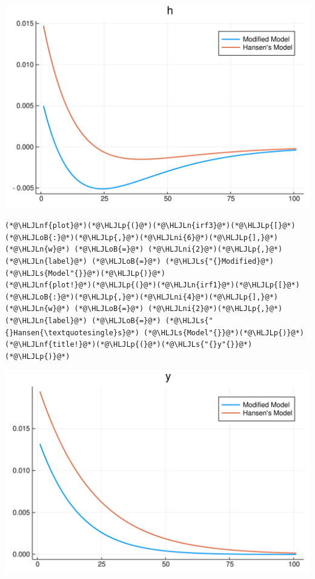 \documentclass[12pt,a4paper]{article}
\newcommand{\HLJLn}[1]{#1}
\newcommand{\HLJLnf}[1]{\textcolor[RGB]{66,102,213}{#1}}
\newcommand{\HLJLs}[1]{\textcolor[RGB]{201,61,57}{#1}}
\newcommand{\HLJLni}[1]{\textcolor[RGB]{59,151,46}{#1}}
\newcommand{\HLJLoB}[1]{\textcolor[RGB]{102,102,102}{\textbf{#1}}}
\newcommand{\HLJLp}[1]{#1}
\begin{document}
\includegraphics[width=\linewidth]{figures/yvan_16_1.pdf}

\begin{lstlisting}
(*@\HLJLnf{plot}@*)(*@\HLJLp{(}@*)(*@\HLJLn{irf3}@*)(*@\HLJLp{[}@*)(*@\HLJLoB{:}@*)(*@\HLJLp{,}@*)(*@\HLJLni{6}@*)(*@\HLJLp{],}@*) (*@\HLJLn{w}@*) (*@\HLJLoB{=}@*) (*@\HLJLni{2}@*)(*@\HLJLp{,}@*) (*@\HLJLn{label}@*) (*@\HLJLoB{=}@*) (*@\HLJLs{"{}Modified}@*) (*@\HLJLs{Model"{}}@*)(*@\HLJLp{)}@*)
(*@\HLJLnf{plot!}@*)(*@\HLJLp{(}@*)(*@\HLJLn{irf1}@*)(*@\HLJLp{[}@*)(*@\HLJLoB{:}@*)(*@\HLJLp{,}@*)(*@\HLJLni{4}@*)(*@\HLJLp{],}@*) (*@\HLJLn{w}@*) (*@\HLJLoB{=}@*) (*@\HLJLni{2}@*)(*@\HLJLp{,}@*) (*@\HLJLn{label}@*) (*@\HLJLoB{=}@*) (*@\HLJLs{"{}Hansen{\textquotesingle}s}@*) (*@\HLJLs{Model"{}}@*)(*@\HLJLp{)}@*)
(*@\HLJLnf{title!}@*)(*@\HLJLp{(}@*)(*@\HLJLs{"{}y"{}}@*)(*@\HLJLp{)}@*)
\end{lstlisting}

\includegraphics[width=\linewidth]{figures/yvan_17_1.pdf}
\end{document}

